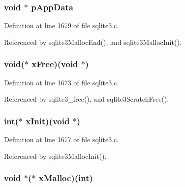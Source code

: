\subsubsection[{p\+App\+Data}]{\setlength{\rightskip}{0pt plus 5cm}void $\ast$ p\+App\+Data}\label{structsqlite3__mem__methods_a2edf2e7445f2f46196126195c7710f75}


Definition at line 1679 of file sqlite3.\+c.



Referenced by sqlite3\+Malloc\+End(), and sqlite3\+Malloc\+Init().

\hypertarget{structsqlite3__mem__methods_a91abab31fe16927c08291ab9b332bf8f}{}
\subsubsection[{x\+Free}]{\setlength{\rightskip}{0pt plus 5cm}void($\ast$ x\+Free)(void $\ast$)}\label{structsqlite3__mem__methods_a91abab31fe16927c08291ab9b332bf8f}


Definition at line 1673 of file sqlite3.\+c.



Referenced by sqlite3\+\_\+free(), and sqlite3\+Scratch\+Free().

\hypertarget{structsqlite3__mem__methods_a707c4748dcafc75384a806d13bb68bdd}{}
\subsubsection[{x\+Init}]{\setlength{\rightskip}{0pt plus 5cm}int($\ast$ x\+Init)(void $\ast$)}\label{structsqlite3__mem__methods_a707c4748dcafc75384a806d13bb68bdd}


Definition at line 1677 of file sqlite3.\+c.



Referenced by sqlite3\+Malloc\+Init().

\hypertarget{structsqlite3__mem__methods_a7eb33731499ee82125a79071c9df4cc7}{}
\subsubsection[{x\+Malloc}]{\setlength{\rightskip}{0pt plus 5cm}void $\ast$($\ast$ x\+Malloc)(int)}\label{structsqlite3__mem__methods_a7eb33731499ee82125a79071c9df4cc7}


